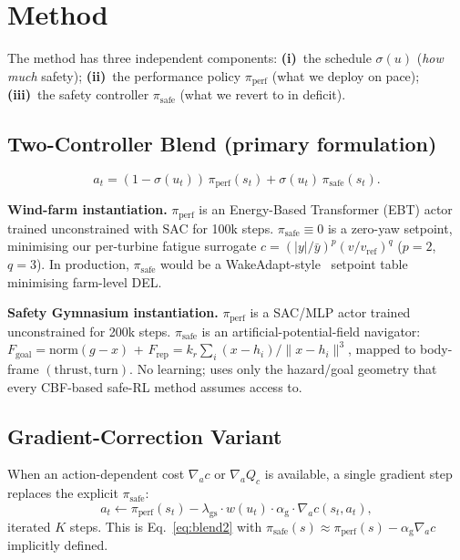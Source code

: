 \documentclass{article}
\begin{document}
\section{Method}
\label{sec:method}

The method has three independent components:
\textbf{(i)}~the schedule $\sigma(u)$ (\emph{how much} safety);
\textbf{(ii)}~the performance policy $\pi_{\mathrm{perf}}$ (what we deploy on pace);
\textbf{(iii)}~the safety controller $\pi_{\mathrm{safe}}$ (what we revert to in deficit).

\subsection{Two-Controller Blend (primary formulation)}
\label{sec:blend}
\begin{equation}
    a_t = (1-\sigma(u_t))\,\pi_{\mathrm{perf}}(s_t) + \sigma(u_t)\,\pi_{\mathrm{safe}}(s_t) .
\label{eq:blend2}
\end{equation}

\textbf{Wind-farm instantiation.}
$\pi_{\mathrm{perf}}$ is an Energy-Based Transformer (EBT) actor trained unconstrained with SAC for 100k steps.
$\pi_{\mathrm{safe}}\!\equiv\!0$ is a zero-yaw setpoint, minimising our per-turbine fatigue surrogate $c=(|y|/\bar{y})^p(v/v_{\mathrm{ref}})^q$ ($p\!=\!2$, $q\!=\!3$).
In production, $\pi_{\mathrm{safe}}$ would be a WakeAdapt-style~\citep{siemensWakeAdapt} setpoint table minimising farm-level DEL.

\textbf{Safety Gymnasium instantiation.}
$\pi_{\mathrm{perf}}$ is a SAC/MLP actor trained unconstrained for 200k steps.
$\pi_{\mathrm{safe}}$ is an artificial-potential-field navigator: $F_{\mathrm{goal}}=\mathrm{norm}(g-x)$ + $F_{\mathrm{rep}}=k_r\sum_i (x-h_i)/\|x-h_i\|^3$, mapped to body-frame $(\mathrm{thrust},\mathrm{turn})$.
No learning; uses only the hazard/goal geometry that every CBF-based safe-RL method assumes access to.

\subsection{Gradient-Correction Variant}
\label{sec:gradient}
When an action-dependent cost $\nabla_a c$ or $\nabla_a Q_c$ is available, a single gradient step replaces the explicit $\pi_{\mathrm{safe}}$:
\begin{equation}
    a_t \leftarrow \pi_{\mathrm{perf}}(s_t) - \lambda_{\mathrm{gs}}\cdot w(u_t)\cdot \alpha_{\mathrm{g}}\cdot \nabla_a c(s_t, a_t),
\label{eq:gradient_correction}
\end{equation}
iterated $K$ steps. This is Eq.~\ref{eq:blend2} with $\pi_{\mathrm{safe}}(s)\!\approx\!\pi_{\mathrm{perf}}(s) - \alpha_{\mathrm{g}}\nabla_a c$ implicitly defined.
\end{document}
